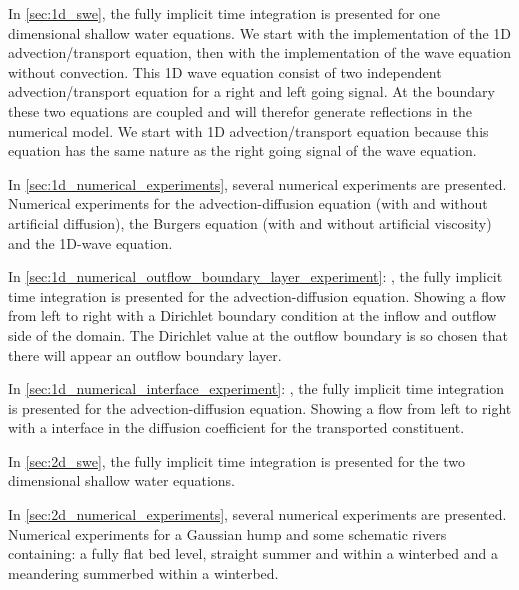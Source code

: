 In \autoref{sec:1d_swe}, the fully implicit time integration is presented for one dimensional shallow water equations.
We start with the implementation of the 1D advection/transport equation, then with the implementation of the wave equation without convection.
This 1D wave equation consist of two independent advection/transport equation for a right and left going signal.
At the boundary these two equations are coupled and will therefor generate reflections in the numerical model.
We start with 1D advection/transport equation because this equation has the same nature as the right going signal of the wave equation.


In \autoref{sec:1d_numerical_experiments}, several numerical experiments are presented.
Numerical experiments for the advection-diffusion equation (with and without artificial diffusion), the Burgers equation (with and without artificial viscosity) and the 1D-wave equation.

In \autoref{sec:1d_numerical_outflow_boundary_layer_experiment}: , the fully implicit time integration is presented for the advection-diffusion equation.
Showing a flow from left to right with a Dirichlet boundary condition at the inflow and outflow side of the domain.
The Dirichlet value at the outflow boundary is so chosen that there will appear an outflow boundary layer.

In \autoref{sec:1d_numerical_interface_experiment}: , the fully implicit time integration is presented for the advection-diffusion equation.
Showing a flow from left to right with a interface in the diffusion coefficient for the transported constituent.

In \autoref{sec:2d_swe}, the fully implicit time integration is presented for the two dimensional shallow water equations.

In \autoref{sec:2d_numerical_experiments}, several numerical experiments are presented.
Numerical experiments for a Gaussian hump and some schematic rivers containing: a fully flat bed level, straight summer and within a winterbed and a meandering summerbed within a winterbed.

